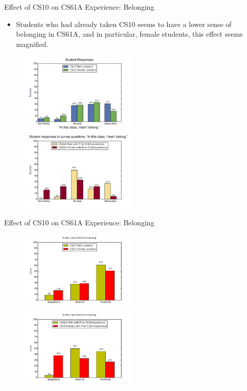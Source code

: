 \documentclass{beamer}                  %
\begin{document}
\begin{frame}{Effect of CS10 on CS61A Experience: Belonging}
  \begin{itemize}
  \item Students who had already taken CS10 seems to have a lower sense of belonging in CS61A, and in particular, female students, this effect seems magnified.
  \end{itemize}

  \begin{figure}[!htbp]
    \centering
    
    \includegraphics[width=0.5\textwidth]{blg_1_male_female.png}
    \includegraphics[width=0.5\textwidth]{blg_1_priorcs10.png}
    
  \end{figure}
\end{frame}
    
\begin{frame}{Effect of CS10 on CS61A Experience: Belonging}

  \begin{figure}[!htbp]
      \centering 
      \includegraphics[width=0.5\textwidth]{blg_1_worstCaseScenario_cs10}
      \includegraphics[width=0.5\textwidth]{blg_1_worstCaseScenario}
  \end{figure}

\end{frame}
\end{document}
